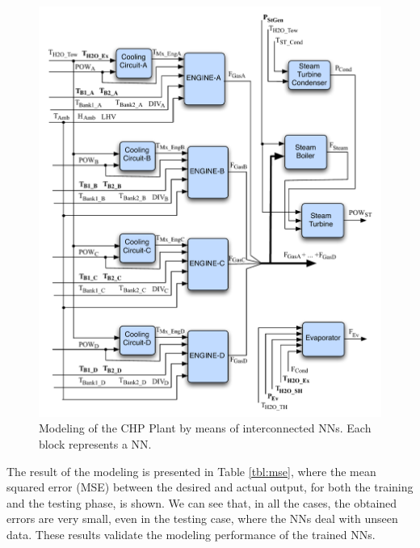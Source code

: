 \begin{figure}
\includegraphics[width=1\textwidth]{NNs.pdf}
\caption{Modeling of the CHP Plant by means of interconnected NNs. Each block represents a NN.}
\label{fignns}
\end{figure}


The result of the modeling is presented in Table \ref{tbl:mse}, where the mean squared error (MSE) between the desired and actual output, for both the training and the testing phase, is shown. We can see that, in all the cases, the obtained  errors are very small, even in the testing case, where the NNs deal with unseen data. These results validate the modeling performance of the trained NNs. 

